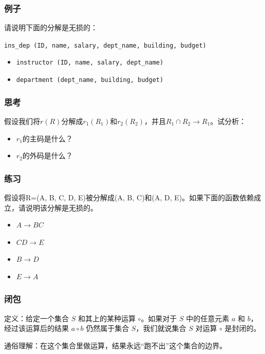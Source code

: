 \documentclass[aspectratio=169, 14pt]{beamer}
\begin{document}
\begin{frame}
	\frametitle{例子}
	请说明下面的分解是无损的：

	\texttt{ins\_dep (ID, name, salary, dept\_name, building, budget)
	}

	\begin{itemize}
		\item \texttt{instructor (ID, name, salary, dept\_name)    }
		\item \texttt{department (dept\_name, building, budget)}
	\end{itemize}


\end{frame}

\begin{frame}
	\frametitle{思考}
	假设我们将$r(R)$分解成$r_1(R_1)$和$r_2(R_2)$，并且$R_1 \cap R_2 \rightarrow R_1$。试分析：

	\begin{itemize}
		\item $r_1$的主码是什么？
		\item $r_2$的外码是什么？
	\end{itemize}


\end{frame}

\begin{frame}
  \frametitle{练习}
假设将R=(A, B, C, D, E)被分解成(A, B, C)和(A, D, E)。如果下面的函数依赖成立，请说明该分解是无损的。

\begin{itemize}
  \item $A \rightarrow BC$
  \item $CD \rightarrow E$
  \item $B \rightarrow D$
  \item $E \rightarrow A$
\end{itemize}

\end{frame}


\begin{frame}
  \frametitle{闭包}
定义：给定一个集合 $S$ 和其上的某种运算 $\circ$。如果对于 $S$ 中的任意元素 $a$ 和 $b$，经过该运算后的结果 $a \circ b$ 仍然属于集合 $S$，我们就说集合 $S$ 对运算 $\circ$ 是封闭的。

通俗理解：在这个集合里做运算，结果永远“跑不出”这个集合的边界。
\end{frame}
\end{document}

